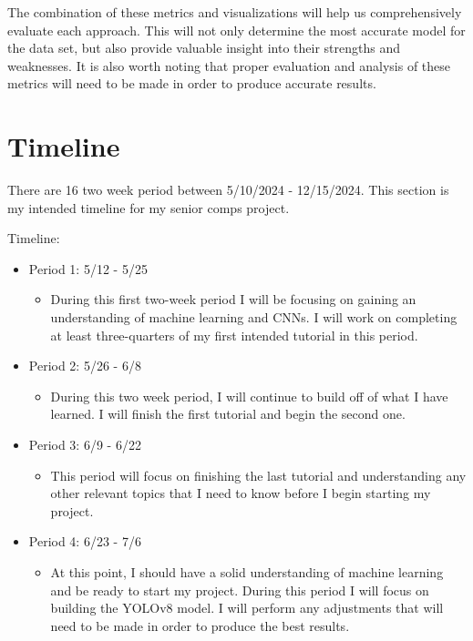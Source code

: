 \documentclass[10pt,twocolumn]{article}
\begin{document}
The combination of these metrics and visualizations will help us comprehensively evaluate each approach. This will not only determine the most accurate model for the data set, but also provide valuable insight into their strengths and weaknesses. It is also worth noting that proper evaluation and analysis of these metrics will need to be made in order to produce accurate results. 

\section{Timeline}
There are 16 two week period between 5/10/2024 - 12/15/2024. This section is my intended timeline for my senior comps project. 

Timeline: 

\begin{itemize}
    \item Period 1: 5/12 - 5/25 
    \begin{itemize}
            \item During this first two-week period I will be focusing on gaining an understanding of machine learning and CNNs. I will work on completing at least three-quarters of my first intended tutorial in this period. 
    \end{itemize}
    \item Period 2: 5/26 - 6/8
    \begin{itemize}
            \item During this two week period, I will continue to build off of what I have learned. I will finish the first tutorial and begin the second one. 
    \end{itemize}
    \item Period 3: 6/9 - 6/22 
    \begin{itemize}
            \item This period will focus on finishing the last tutorial and understanding any other relevant topics that I need to know before I begin starting my project. 
    \end{itemize}
    \item Period 4: 6/23 - 7/6
    \begin{itemize}
            \item At this point, I should have a solid understanding of machine learning and be ready to start my project. During this period I will focus on building the YOLOv8 model. I will perform any adjustments that will need to be made in order to produce the best results. 
    \end{itemize}

\end{itemize}
\end{document}
